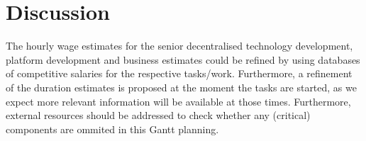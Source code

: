 \section{Discussion}\label{sec:discussion}
The hourly wage estimates for the senior decentralised technology development, platform development and business estimates could be refined by using databases of competitive salaries for the respective tasks/work. Furthermore, a refinement of the duration estimates is proposed at the moment the tasks are started, as we expect more relevant information will be available at those times. Furthermore, external resources should be addressed to check whether any (critical) components are ommited in this Gantt planning.